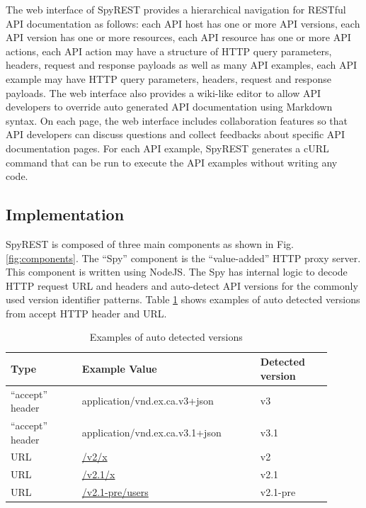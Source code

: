 \documentclass[conference]{IEEEtran}
\begin{document}
The web interface of SpyREST provides a hierarchical navigation for RESTful API documentation as follows: each API host has one or more API versions, each API version has one or more resources, each API resource has one or more API actions, each API action may have a structure of HTTP query parameters, headers, request and response payloads as well as many API examples, each API example may have HTTP query parameters, headers, request and response payloads. The web interface also provides a wiki-like editor to allow API developers to override auto generated API documentation using Markdown syntax. On each page, the web interface includes collaboration features so that API developers can discuss questions and collect feedbacks about specific API documentation pages. For each API example, SpyREST generates a cURL command that can be run to execute the API examples without writing any code.


\subsection{Implementation} %
\label{sub:implementation}

SpyREST is composed of three main components as shown in Fig. \ref{fig:components}. The ``Spy'' component is the ``value-added'' HTTP proxy server. This component is written using NodeJS. The Spy has internal logic to decode HTTP request URL and headers and auto-detect API versions for the commonly used version identifier patterns. Table \ref{table:versions} shows examples of auto detected versions from accept HTTP header and URL.

\begin{table}[!tbh]
  \caption{Examples of auto detected versions}
  \begin{tabular}{|p{0.2\linewidth}|p{0.5\linewidth}|p{0.2\linewidth}|}
    \hline
    Type & Example Value & Detected version\\
    \hline
    ``accept'' header & application/vnd.ex.ca.v3+json & v3\\
    \hline
    ``accept'' header & application/vnd.ex.ca.v3.1+json & v3.1\\
    \hline
    URL & \url{/v2/x} & v2\\
    \hline
    URL & \url{/v2.1/x} & v2.1\\
    \hline
    URL & \url{/v2.1-pre/users} & v2.1-pre\\
    \hline
  \end{tabular}
  \label{table:versions}
\end{table}
\end{document}
